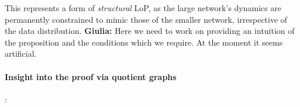 \documentclass{article}
\newcommand{\giulia}[1]{{\color{ForestGreen}\textbf{Giulia:} #1}}
\newtheorem{proposition}{Proposition}[section]
\newtheorem{corollary}{Corollary}[section]
\begin{document}

This represents a form of \emph{structural} LoP, as the large network's dynamics are permanently constrained to mimic those of the smaller network, irrespective of the data distribution. \giulia{Here we need to work on providing an intuition of the proposition and the conditions which we require. At the moment it seems artificial.}

\paragraph{Insight into the proof via quotient graphs}: 

\end{document}
